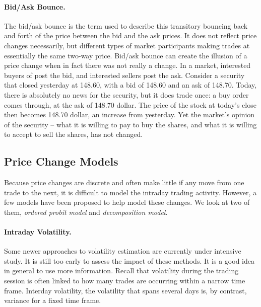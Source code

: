 \paragraph{Bid/Ask Bounce.} The bid/ask bounce is the term used to describe this transitory bouncing back and forth of the price between the bid and the ask prices. It does not reflect price changes necessarily, but different types of market participants making trades at essentially the same two-way price. Bid/ask bounce can create the illusion of a price change when in fact there was not really a change. In a market, interested buyers of post the bid, and interested sellers post the ask. Consider a security that closed yesterday at 148.60, with a bid of 148.60 and an ask of 148.70. Today, there is absolutely no news for the security, but it does trade once: a buy order comes through, at the ask of 148.70 dollar. The price of the stock at today's close then becomes 148.70 dollar, an increase from yesterday. Yet the market's opinion of the security -- what it is willing to pay to buy the shares, and what it is willing to accept to sell the shares, has not changed. 

\subsection{Price Change Models}
Because price changes are discrete and often make little if any move from one trade to the next, it is difficult to model the intraday trading activity. However, a few models have been proposed to help model these changes. We look at two of them, \emph{ordered probit model} and \emph{decomposition model}.

\paragraph{Intraday Volatility.} Some newer approaches to volatility estimation are currently under intensive study. It is still too early to assess the impact of these methods. It is a good idea in general to use more information.  Recall that volatility during the trading session is often linked to how many trades are occurring within a narrow time frame. Interday volatility, the volatility that spans several days is, by contrast, variance for a fixed time frame.

